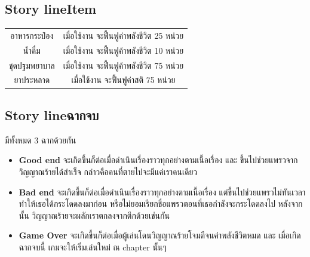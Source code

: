 \subsection{\ifenglish Story line\else Item\fi }
\begin{center}
    \begin{tabular}{|c|c|}
        \hline
        อาหารกระป๋อง & เมื่อใช้งาน จะฟื้นฟูค่าพลังชีวิต 25 หน่วย \\
        น้ำดื่ม         & เมื่อใช้งาน จะฟื้นฟูค้าพลังชีวิต 10 หน่วย \\
        ชุดปฐมพยาบาล & เมื่อใช้งาน จะฟื้นฟูค้าพลังชีวิต 75 หน่วย \\
        ยาประหลาด   & เมื่อใช้งาน จะฟื้นฟูค่าสติ 75 หน่วย     \\
        \hline
    \end{tabular}
\end{center}
\subsection{\ifenglish Story line\else ฉากจบ\fi }
มีทั้งหมด 3 ฉากด้วยกัน
\begin{itemize}
    \item \textbf{Good end} จะเกิดขึ้นก็ต่อเมื่อดำเนินเรื่องราวทุกอย่างตามเนื้อเรื่อง และ ขึ้นไปช่วยแพรวจากวิญญาณร้ายได้สำเร็จ กล่าวคือคนที่ตายไปจะมีแค่เราคนเดียว
    \item \textbf{Bad end} จะเกิดขึ้นก็ต่อเมื่อดำเนินเรื่องราวทุกอย่างตามเนื้อเรื่อง แต่ขึ้นไปช่วยแพรวไม่ทันเวลา ทำให้เธอได้กระโดดลงมาก่อน หรือไม่ยอมเรียกชื่อแพรวตอนที่เธอกำลังจะกระโดดลงไป หลังจากนั้น วิญญาณร้ายจะผลักเราตกลงจากตึกด้วยเช่นกัน
    \item \textbf{Game Over} จะเกิดขึ้นก็ต่อเมื่อผู้เล่นโดนวิญญาณร้ายโจมตีจนค่าพลังชีวิตหมด และ เมื่อเกิดฉากจบนี้ เกมจะให้เริ่มเล่นใหม่ ณ chapter นั้นๆ
\end{itemize}


